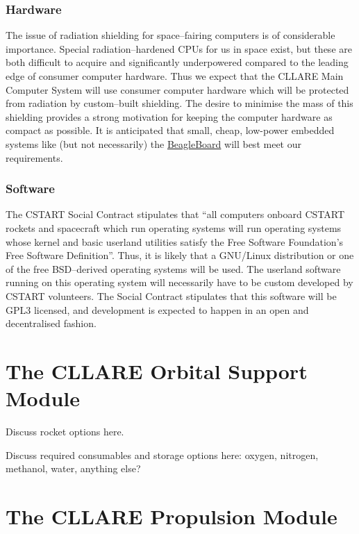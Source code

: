 \documentclass{report}
\begin{document}
\subsubsection{Hardware}

The issue of radiation shielding for space--fairing computers is of considerable importance.  Special radiation--hardened CPUs for us in space exist, but these are both difficult to acquire and significantly underpowered compared to the leading edge of consumer computer hardware.  Thus we expect that the CLLARE Main Computer System will use consumer computer hardware which will be protected from radiation by custom--built shielding.  The desire to minimise the mass of this shielding provides a strong motivation for keeping the computer hardware as compact as possible.  It is anticipated that small, cheap, low-power embedded systems like (but not necessarily) the \href{http://beagleboard.org}{BeagleBoard} will best meet our requirements.

\subsubsection{Software}

The CSTART Social Contract stipulates that ``all computers onboard CSTART rockets and spacecraft which run operating systems will run operating systems whose kernel and basic userland utilities satisfy the Free Software Foundation's Free Software Definition''.  Thus, it is likely that a GNU/Linux distribution or one of the free BSD--derived operating systems will be used.  The userland software running on this operating system will necessarily have to be custom developed by CSTART volunteers.  The Social Contract stipulates that this software will be GPL3 licensed, and development is expected to happen in an open and decentralised fashion.

\section{The CLLARE Orbital Support Module}

Discuss rocket options here.

Discuss required consumables and storage options here: oxygen, nitrogen, methanol, water, anything else?


\section{The CLLARE Propulsion Module}
\end{document}
